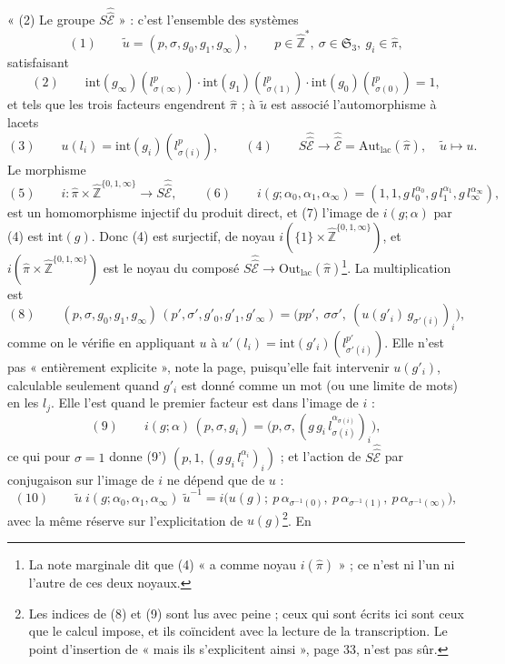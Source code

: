 \documentclass[11pt,a4paper]{article}
\begin{document}
« (2) Le groupe $S\hat{\hat{\mathcal{E}}}$ » : c'est l'ensemble des systèmes
\[
(1)\qquad \tilde u = (p, \sigma, g_0, g_1, g_\infty), \qquad p \in
\widehat{\mathbb{Z}}^{*},\ \sigma \in \mathfrak{S}_3,\ g_i \in \widehat{\pi},
\]
satisfaisant
\[
(2)\qquad \mathrm{int}(g_\infty)(l_{\sigma(\infty)}^{p}) \cdot
\mathrm{int}(g_1)(l_{\sigma(1)}^{p}) \cdot \mathrm{int}(g_0)(l_{\sigma(0)}^{p})
= 1,
\]
et tels que les trois facteurs engendrent $\widehat{\pi}$ ; à $\tilde u$ est
associé l'automorphisme à lacets
\[
(3)\qquad u(l_i) = \mathrm{int}(g_i)(l_{\sigma(i)}^{p}), \qquad
(4)\qquad S\hat{\hat{\mathcal{E}}} \longrightarrow \hat{\hat{\mathcal{E}}} =
\mathrm{Aut}_{\mathrm{lac}}(\widehat{\pi}), \quad \tilde u \mapsto u .
\]
Le morphisme
\[
(5)\qquad i : \widehat{\pi} \times \widehat{\mathbb{Z}}^{\{0,1,\infty\}}
\longrightarrow S\hat{\hat{\mathcal{E}}}, \qquad
(6)\qquad i(g; \alpha_0, \alpha_1, \alpha_\infty) = (1, 1, g\, l_0^{\alpha_0},
g\, l_1^{\alpha_1}, g\, l_\infty^{\alpha_\infty}),
\]
est un homomorphisme injectif du produit direct, et (7) l'image de
$i(g; \alpha)$ par (4) est $\mathrm{int}(g)$. Donc (4) est surjectif, de noyau
$i(\{1\} \times \widehat{\mathbb{Z}}^{\{0,1,\infty\}})$, et
$i(\widehat{\pi} \times \widehat{\mathbb{Z}}^{\{0,1,\infty\}})$ est le noyau du
composé $S\hat{\hat{\mathcal{E}}} \to
\mathrm{Out}_{\mathrm{lac}}(\widehat{\pi})$\footnote{La note marginale dit que
(4) « a comme noyau $i(\hat\pi)$ » ; ce n'est ni l'un ni l'autre de ces deux
noyaux.}. La multiplication est
\[
(8)\qquad (p, \sigma, g_0, g_1, g_\infty)\,(p', \sigma', g'_0, g'_1, g'_\infty)
= \bigl(pp',\ \sigma\sigma',\ (u(g'_i)\, g_{\sigma'(i)})_{i}\bigr),
\]
comme on le vérifie en appliquant $u$ à $u'(l_i) = \mathrm{int}(g'_i)
(l_{\sigma'(i)}^{p'})$. Elle n'est pas « entièrement explicite », note la page,
puisqu'elle fait intervenir $u(g'_i)$, calculable seulement quand $g'_i$ est
donné comme un mot (ou une limite de mots) en les $l_j$. Elle l'est quand le
premier facteur est dans l'image de $i$ :
\[
(9)\qquad i(g; \alpha)\,(p, \sigma, g_i) = \bigl(p, \sigma, (g\, g_i\,
l_{\sigma(i)}^{\alpha_{\sigma(i)}})_i\bigr),
\]
ce qui pour $\sigma = 1$ donne (9') $(p, 1, (g\, g_i\, l_i^{\alpha_i})_i)$ ; et
l'action de $S\hat{\hat{\mathcal{E}}}$ par conjugaison sur l'image de $i$ ne
dépend que de $u$ :
\[
(10)\qquad \tilde u\; i(g; \alpha_0, \alpha_1, \alpha_\infty)\; \tilde u^{-1}
= i\bigl(u(g);\ p\,\alpha_{\sigma^{-1}(0)},\ p\,\alpha_{\sigma^{-1}(1)},\
p\,\alpha_{\sigma^{-1}(\infty)}\bigr),
\]
avec la même réserve sur l'explicitation de $u(g)$\footnote{Les indices de (8)
et (9) sont lus avec peine ; ceux qui sont écrits ici sont ceux que le calcul
impose, et ils coïncident avec la lecture de la transcription. Le point
d'insertion de « mais ils s'explicitent ainsi », page 33, n'est pas sûr.}. En
\end{document}
